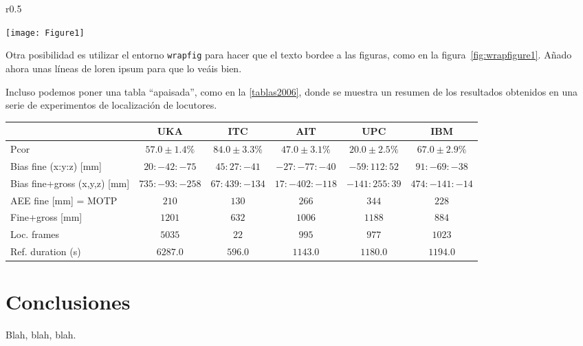  

\begin{wrapfigure}{r}{0.5\textwidth} 
\vspace{-20pt}
  \begin{center}
    \texttt{[image: Figure1]}
    \caption{Ejemplo de figura con wrapfigure.}
    \label{fig:wrapfigure1}
  \end{center}
  \vspace{-20pt}
  \vspace{1pt}
\end{wrapfigure} 

Otra posibilidad es utilizar el entorno \texttt{wrapfig} para hacer que
el texto bordee a las figuras, como en la
figura~\ref{fig:wrapfigure1}. Añado ahora unas líneas de loren ipsum
para que lo veáis bien. \lipsum[1-1]




Incluso podemos poner una tabla ``apaisada'', como en la
\ref{tablas2006}, donde se muestra un resumen de los resultados
obtenidos en una serie de experimentos de localización de locutores.

\clearpage
\begin{sidewaystable}[hbtp]
  \begin{center}

    \begin{tabular}{||l|c|c|c|c|c||}
      \hline \hline
      & UKA & ITC & AIT & UPC & IBM\\
      \hline
      \hline
      Pcor & $57.0\pm1.4\%$ & $84.0\pm3.3\%$ & $47.0\pm3.1\%$ & $20.0\pm2.5\%$ & $67.0\pm2.9\%$ \\
      \hline
      Bias fine (x:y:z) [mm] & $20:-42:-75$ & $45:27:-41$ & $-27:-77:-40$ & $-59:112:52$ & $91:-69:-38$ \\
      \hline
      Bias fine+gross (x,y,z) [mm] & $735:-93:-258$ & $67:439:-134$ & $17:-402:-118$ & $-141:255:39$ & $474:-141:-14$ \\
      \hline
      AEE fine [mm] = MOTP & $210$ & $130$ & $266$ & $344$ & $228$ \\
      \hline
      Fine+gross [mm] & $1201$ & $632$ & $1006$ & $1188$ & $884$ \\
      \hline
      Loc. frames & $5035$ & $22$ & $995$ & $977$ & $1023$ \\
      \hline
      Ref. duration (s) & $6287.0$ & $596.0$ & $1143.0$ & $1180.0$ & $1194.0$ \\
      \hline \hline
    \end{tabular}
    \caption{Resultados TEST CLEAR 2006.}
    \label{tablas2006}
  \end{center}
\end{sidewaystable}


\section{Conclusiones}
\label{sec:conclusiones-resultados}

Blah, blah, blah.


